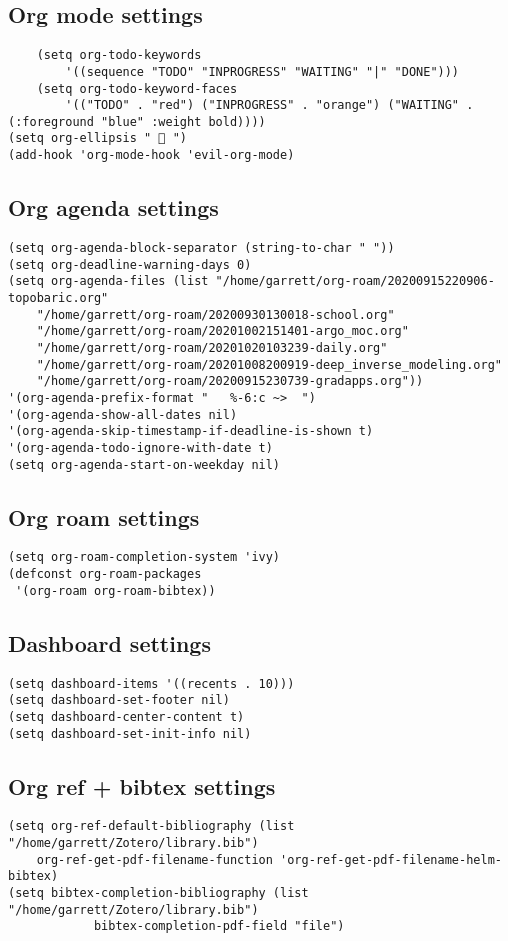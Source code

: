 \documentclass[11pt]{article}
\begin{document}
\subsection{Org mode settings}
\label{sec:org0296b40}
\begin{verbatim}
    (setq org-todo-keywords
	    '((sequence "TODO" "INPROGRESS" "WAITING" "|" "DONE")))
    (setq org-todo-keyword-faces
	    '(("TODO" . "red") ("INPROGRESS" . "orange") ("WAITING" . (:foreground "blue" :weight bold))))
(setq org-ellipsis "  ")
(add-hook 'org-mode-hook 'evil-org-mode)
\end{verbatim}
\subsection{Org agenda settings}
\label{sec:orgd65d71d}
\begin{verbatim}
(setq org-agenda-block-separator (string-to-char " "))
(setq org-deadline-warning-days 0)
(setq org-agenda-files (list "/home/garrett/org-roam/20200915220906-topobaric.org"
    "/home/garrett/org-roam/20200930130018-school.org" 
    "/home/garrett/org-roam/20201002151401-argo_moc.org"
    "/home/garrett/org-roam/20201020103239-daily.org"
    "/home/garrett/org-roam/20201008200919-deep_inverse_modeling.org"
    "/home/garrett/org-roam/20200915230739-gradapps.org"))
'(org-agenda-prefix-format "   %-6:c ~>  ")
'(org-agenda-show-all-dates nil)
'(org-agenda-skip-timestamp-if-deadline-is-shown t)
'(org-agenda-todo-ignore-with-date t)
(setq org-agenda-start-on-weekday nil)
\end{verbatim}

\subsection{Org roam settings}
\label{sec:org4b44e19}
\begin{verbatim}
(setq org-roam-completion-system 'ivy)
(defconst org-roam-packages
 '(org-roam org-roam-bibtex))
\end{verbatim}

\subsection{Dashboard settings}
\label{sec:orgafe6776}
\begin{verbatim}
(setq dashboard-items '((recents . 10)))
(setq dashboard-set-footer nil)
(setq dashboard-center-content t)
(setq dashboard-set-init-info nil)
\end{verbatim}
\subsection{Org ref + bibtex settings}
\label{sec:org93ef5ac}
\begin{verbatim}
(setq org-ref-default-bibliography (list "/home/garrett/Zotero/library.bib")
    org-ref-get-pdf-filename-function 'org-ref-get-pdf-filename-helm-bibtex)
(setq bibtex-completion-bibliography (list "/home/garrett/Zotero/library.bib")
			bibtex-completion-pdf-field "file")
\end{verbatim}
\end{document}
